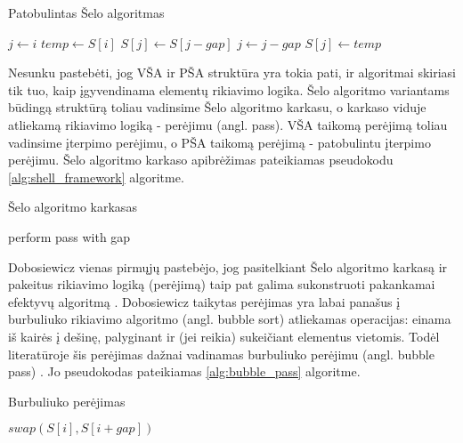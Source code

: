 \documentclass{VUMIFInfKursinis}
\begin{document}
\begin{algorithm}[H]
  \caption{Patobulintas Šelo algoritmas}\label{alg:iss}
  \begin{algorithmic}[1]
        \label{alg:iss:check}
          \State $j\gets i$\label{alg:iss:inner:start}
          \State $temp\gets S[i]$
          \Repeat\label{alg:iss:loop:start}
            \State $S[j]\gets S[j - gap]$
            \State $j\gets j-gap$
          \label{alg:iss:loop:end}
          \State $S[j]\gets temp$\label{alg:iss:inner:end}
        \EndIf
      \EndFor
    \EndFor
  \end{algorithmic}
\end{algorithm}

Nesunku pastebėti, jog VŠA ir PŠA struktūra yra tokia pati, ir algoritmai skiriasi tik tuo,
kaip įgyvendinama elementų rikiavimo logika.
Šelo algoritmo variantams būdingą struktūrą toliau vadinsime Šelo algoritmo karkasu,
o karkaso viduje atliekamą rikiavimo logiką - perėjimu (angl. pass).
VŠA taikomą perėjimą toliau vadinsime įterpimo perėjimu,
o PŠA taikomą perėjimą - patobulintu įterpimo perėjimu.
Šelo algoritmo karkaso apibrėžimas pateikiamas pseudokodu \ref{alg:shell_framework} algoritme.

\begin{algorithm}[H]
  \caption{Šelo algoritmo karkasas}\label{alg:shell_framework}
  \begin{algorithmic}[1]
        \State perform pass with gap
    \EndFor
  \end{algorithmic}
\end{algorithm}

Dobosiewicz vienas pirmųjų pastebėjo, jog pasitelkiant
Šelo algoritmo karkasą ir pakeitus rikiavimo logiką (perėjimą) taip pat galima sukonstruoti pakankamai
efektyvų algoritmą \cite{dobosiewicz1980efficient}.
Dobosiewicz taikytas perėjimas yra labai panašus į burbuliuko rikiavimo algoritmo (angl. bubble sort) atliekamas operacijas:
einama iš kairės į dešinę, palyginant ir (jei reikia) sukeičiant elementus vietomis.
Todėl literatūroje šis perėjimas dažnai vadinamas burbuliuko perėjimu (angl. bubble pass) \cite{sedgewick1996analysis}.
Jo pseudokodas pateikiamas \ref{alg:bubble_pass} algoritme.

\begin{algorithm}[H]
  \caption{Burbuliuko perėjimas}\label{alg:bubble_pass}
  \begin{algorithmic}[1]
        \State $swap(S[i], S[i+gap])$
      \EndIf
    \EndFor
  \end{algorithmic}
\end{algorithm}
\end{document}
